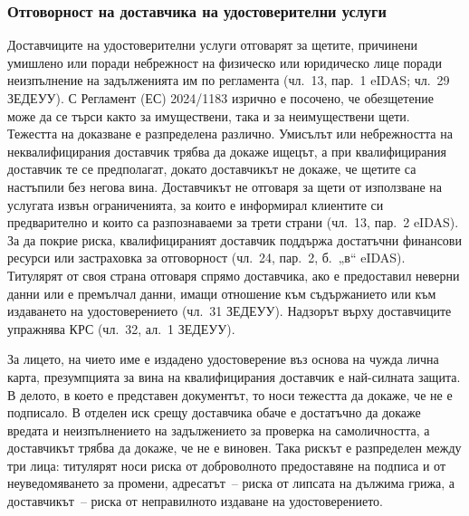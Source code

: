 \subsubsection{Отговорност на доставчика на удостоверителни услуги}
\label{sec:otgovornost}

Доставчиците на удостоверителни услуги отговарят за щетите, причинени умишлено или поради
небрежност на физическо или юридическо лице поради неизпълнение на задълженията им по
регламента (чл.~13, пар.~1 eIDAS; чл.~29 ЗЕДЕУУ). С Регламент (ЕС) 2024/1183 изрично е
посочено, че обезщетение може да се търси както за имуществени, така и за неимуществени
щети. Тежестта на доказване е разпределена различно. Умисълът или небрежността на
неквалифицирания доставчик трябва да докаже ищецът, а при квалифицирания доставчик те се
предполагат, докато доставчикът не докаже, че щетите са настъпили без негова вина.
Доставчикът не отговаря за щети от използване на услугата извън ограниченията, за които е
информирал клиентите си предварително и които са разпознаваеми за трети страни (чл.~13,
пар.~2 eIDAS). За да покрие риска, квалифицираният доставчик поддържа достатъчни финансови
ресурси или застраховка за отговорност (чл.~24, пар.~2, б.~„в“ eIDAS). Титулярят от своя
страна отговаря спрямо доставчика, ако е предоставил неверни данни или е премълчал данни,
имащи отношение към съдържанието или към издаването на удостоверението (чл.~31 ЗЕДЕУУ).
Надзорът върху доставчиците упражнява КРС (чл.~32, ал.~1 ЗЕДЕУУ).

За лицето, на чието име е издадено удостоверение въз основа на чужда лична карта,
презумпцията за вина на квалифицирания доставчик е най-силната защита. В делото, в което
е представен документът, то носи тежестта да докаже, че не е подписало. В отделен иск
срещу доставчика обаче е достатъчно да докаже вредата и неизпълнението на задължението за
проверка на самоличността, а доставчикът трябва да докаже, че не е виновен. Така рискът е
разпределен между три лица: титулярят носи риска от доброволното предоставяне на подписа и
от неуведомяването за промени, адресатът~-- риска от липсата на дължима грижа, а
доставчикът~-- риска от неправилното издаване на удостоверението.

